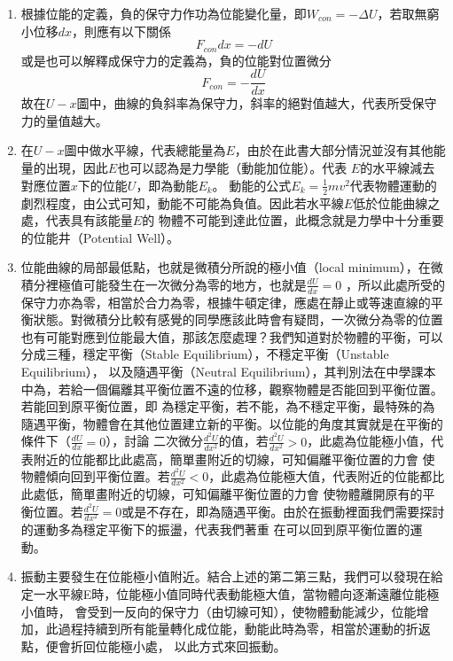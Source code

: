 \documentclass[cn,10pt,math=newtx,chinesefont=founder]{elegantbook}
\begin{document}
\begin{enumerate}
    \item 根據位能的定義，負的保守力作功為位能變化量，即$W_{con}=-\Delta U$，若取無窮小位移$dx$，則應有以下關係
    \begin{equation}
        F_{con} dx = -dU
    \end{equation}
    或是也可以解釋成保守力的定義為，負的位能對位置微分
    \begin{equation}
        F_{con} = - \frac{dU}{dx}
    \end{equation}
    故在$U-x$圖中，曲線的負斜率為保守力，斜率的絕對值越大，代表所受保守力的量值越大。
    \item 在$U-x$圖中做水平線，代表總能量為$E$，由於在此書大部分情況並沒有其他能量的出現，因此$E$也可以認為是力學能（動能加位能）。代表
    $E$的水平線減去對應位置$x$下的位能$U$，即為動能$E_k$。
    動能的公式$E_k = \frac{1}{2}mv^2$代表物體運動的劇烈程度，由公式可知，動能不可能為負值。因此若水平線$E$低於位能曲線之處，代表具有該能量$E$的
    物體不可能到達此位置，此概念就是力學中十分重要的位能井（Potential Well）。
    \item 位能曲線的局部最低點，也就是微積分所說的極小值（local minimum），在微積分裡極值可能發生在一次微分為零的地方，也就是$ \frac{dU}{dx} = 0$
    ，所以此處所受的保守力亦為零，相當於合力為零，根據牛頓定律，應處在靜止或等速直線的平衡狀態。對微積分比較有感覺的同學應該此時會有疑問，一次微分為零的位置
    也有可能對應到位能最大值，那該怎麼處理？我們知道對於物體的平衡，可以分成三種，穩定平衡（Stable Equilibrium），不穩定平衡（Unstable Equilibrium），
    以及隨遇平衡（Neutral Equilibrium），其判別法在中學課本中為，若給一個偏離其平衡位置不遠的位移，觀察物體是否能回到平衡位置。若能回到原平衡位置，即
    為穩定平衡，若不能，為不穩定平衡，最特殊的為隨遇平衡，物體會在其他位置建立新的平衡。以位能的角度其實就是在平衡的條件下（$ \frac{dU}{dx} = 0$），討論
    二次微分$\frac{d^2 U}{dx^2}$的值，若$\frac{d^2 U}{dx^2}>0$，此處為位能極小值，代表附近的位能都比此處高，簡單畫附近的切線，可知偏離平衡位置的力會
    使物體傾向回到平衡位置。若$\frac{d^2 U}{dx^2}<0$，此處為位能極大值，代表附近的位能都比此處低，簡單畫附近的切線，可知偏離平衡位置的力會
    使物體離開原有的平衡位置。若$\frac{d^2 U}{dx^2}=0$或是不存在，即為隨遇平衡。由於在振動裡面我們需要探討的運動多為穩定平衡下的振盪，代表我們著重
    在可以回到原平衡位置的運動。
    \item 振動主要發生在位能極小值附近。結合上述的第二第三點，我們可以發現在給定一水平線E時，位能極小值同時代表動能極大值，當物體向逐漸遠離位能極小值時，
    會受到一反向的保守力（由切線可知），使物體動能減少，位能增加，此過程持續到所有能量轉化成位能，動能此時為零，相當於運動的折返點，便會折回位能極小處，
    以此方式來回振動。

\end{enumerate}
\end{document}

